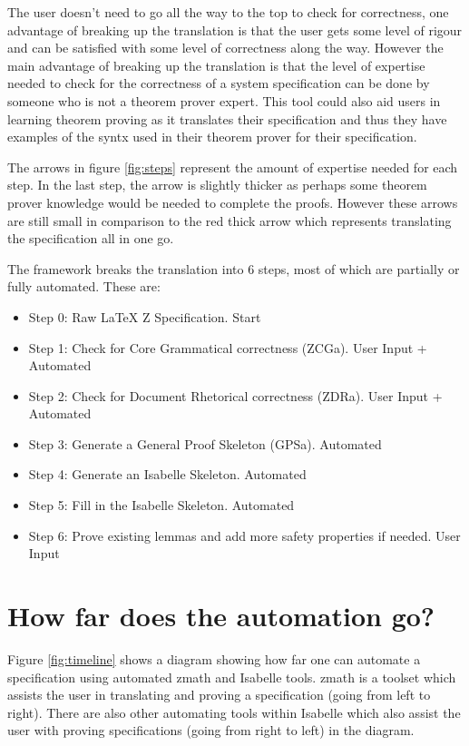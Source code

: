 The user doesn't need to go all the way to the top to check for correctness, one
advantage of breaking up the translation is that the user gets some level of
rigour and can be satisfied with some level of correctness along the way.
However the main advantage of breaking up the translation is that the level of
expertise needed to check for the correctness of a system specification can be
done by someone who is not a theorem prover expert. This tool could also aid
users in learning theorem proving as it translates their specification and thus
they have examples of the syntx used in their theorem prover for their
specification. 

The arrows in figure \ref{fig:steps} represent the amount of expertise needed
for each step. In the last step, the arrow is slightly thicker as perhaps some
theorem prover knowledge would be needed to complete the proofs. However these
arrows are still small in comparison to the red thick arrow which represents
translating the specification all in one go.

The framework breaks the translation into 6 steps, most of which are partially
or fully automated. These are:

\begin{itemize}
\item Step 0: Raw LaTeX Z Specification. {\color{set}Start}
\item Step 1: Check for Core Grammatical correctness (ZCGa). {\color{set}User Input + Automated}
\item Step 2: Check for Document Rhetorical correctness (ZDRa). {\color{set}User Input + Automated}
\item Step 3: Generate a General Proof Skeleton (GPSa). {\color{set}Automated}
\item Step 4: Generate an Isabelle Skeleton. {\color{set}Automated}
\item Step 5: Fill in the Isabelle Skeleton. {\color{set}Automated}
\item Step 6: Prove existing lemmas and add more safety properties if needed. {\color{set}User Input}
\end{itemize}

\section{How far does the automation go?}

Figure \ref{fig:timeline} shows a diagram showing how far one can automate a
specification using automated \gls{zmath} and Isabelle tools. \Gls{zmath} is a
toolset which assists the user in translating and proving a specification (going
from left to right). There are also other automating tools within Isabelle which
also assist the user with proving specifications (going from right to left) in
the diagram.

